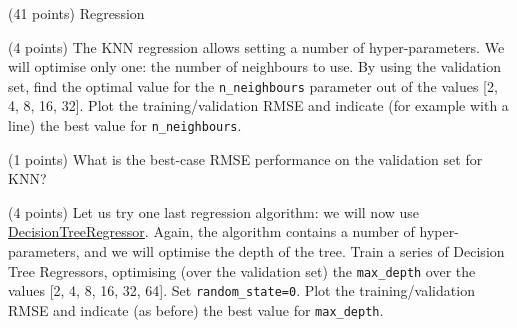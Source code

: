 \documentclass[12pt]{article}
\begin{document}
\begin{question}{\label{Q_LR_BA}(41 points) Regression}
\begin{subquestion}
\end{subquestion}

\begin{subquestion}{(4 points) The KNN regression allows setting a number of hyper-parameters. We will optimise only one: the number of neighbours to use. By using the validation set, find the optimal value for the \texttt{n\_neighbours} parameter out of the values [2, 4, 8, 16, 32]. Plot the training/validation RMSE and indicate (for example with a line) the best value for \texttt{n\_neighbours}.}






\end{subquestion}

\begin{subquestion}{(1 points) What is the best-case RMSE performance on the validation set for KNN?}






\end{subquestion}

\begin{subquestion}{(4 points) Let us try one last regression algorithm: we will now use \href{https://scikit-learn.org/stable/modules/generated/sklearn.tree.DecisionTreeRegressor.html}{DecisionTreeRegressor}. Again, the algorithm contains a number of hyper-parameters, and we will optimise the depth of the tree. Train a series of Decision Tree Regressors, optimising (over the validation set) the \texttt{max\_depth} over the values [2, 4, 8, 16, 32, 64]. Set \texttt{random\_state=0}. Plot the training/validation RMSE and indicate (as before) the best value for \texttt{max\_depth}.}




\end{subquestion}
\end{question}
\end{document}
